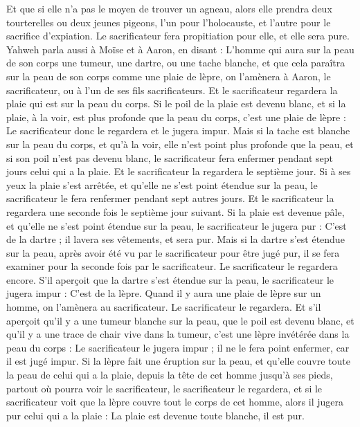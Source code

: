 \begin{multicols}{2}
Et que si elle n'a pas le moyen de trouver un agneau, alors elle prendra deux tourterelles ou deux jeunes pigeons, l'un pour l'holocauste, et l'autre pour le sacrifice d'expiation. Le sacrificateur fera propitiation pour elle, et elle sera pure.
\VerseOne{}Yahweh parla aussi à Moïse et à Aaron, en disant :
L'homme qui aura sur la peau de son corps une tumeur, une dartre, ou une tache blanche, et que cela paraîtra sur la peau de son corps comme une plaie de lèpre, on l'amènera à Aaron, le sacrificateur, ou à l'un de ses fils sacrificateurs.
Et le sacrificateur regardera la plaie qui est sur la peau du corps. Si le poil de la plaie est devenu blanc, et si la plaie, à la voir, est plus profonde que la peau du corps, c'est une plaie de lèpre : Le sacrificateur donc le regardera et le jugera impur.
Mais si la tache est blanche sur la peau du corps, et qu'à la voir, elle n'est point plus profonde que la peau, et si son poil n'est pas devenu blanc, le sacrificateur fera enfermer pendant sept jours celui qui a la plaie.
Et le sacrificateur la regardera le septième jour. Si à ses yeux la plaie s'est arrêtée, et qu'elle ne s'est point étendue sur la peau, le sacrificateur le fera renfermer pendant sept autres jours.
Et le sacrificateur la regardera une seconde fois le septième jour suivant. Si la plaie est devenue pâle, et qu'elle ne s'est point étendue sur la peau, le sacrificateur le jugera pur : C'est de la dartre ; il lavera ses vêtements, et sera pur.
Mais si la dartre s'est étendue sur la peau, après avoir été vu par le sacrificateur pour être jugé pur, il se fera examiner pour la seconde fois par le sacrificateur.
Le sacrificateur le regardera encore. S'il aperçoit que la dartre s'est étendue sur la peau, le sacrificateur le jugera impur : C'est de la lèpre.
Quand il y aura une plaie de lèpre sur un homme, on l'amènera au sacrificateur.
Le sacrificateur le regardera. Et s'il aperçoit qu'il y a une tumeur blanche sur la peau, que le poil est devenu blanc, et qu'il y a une trace de chair vive dans la tumeur,
c'est une lèpre invétérée dans la peau du corps : Le sacrificateur le jugera impur ; il ne le fera point enfermer, car il est jugé impur.
Si la lèpre fait une éruption sur la peau, et qu'elle couvre toute la peau de celui qui a la plaie, depuis la tête de cet homme jusqu'à ses pieds, partout où pourra voir le sacrificateur, le sacrificateur le regardera,
et si le sacrificateur voit que la lèpre couvre tout le corps de cet homme, alors il jugera pur celui qui a la plaie : La plaie est devenue toute blanche, il est pur.

\end{multicols}
